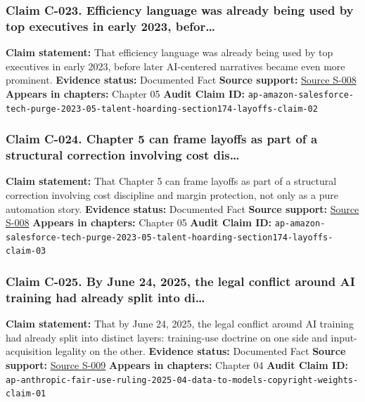 \documentclass[
  american,
  11pt,
  letterpaper,
]{article}
\begin{document}
\subsubsection{Claim C-023. Efficiency language was already being used
by top executives in early 2023,
befor\ldots{}}\label{claim-c-023-efficiency-language-was-already-being-used-by-top-executives-in-early-2023-befor}

\textbf{Claim statement:} That efficiency language was already being
used by top executives in early 2023, before later AI-centered
narratives became even more prominent. \textbf{Evidence status:}
Documented Fact \textbf{Source support:}
\hyperref[source-s-008-amazon-salesforce-jettison-jobs-in-latest-tech-worker-purge]{Source
S-008} \textbf{Appears in chapters:} Chapter 05 \textbf{Audit Claim ID:}
\texttt{ap-amazon-salesforce-tech-purge-2023-05-talent-hoarding-section174-layoffs-claim-02}

\subsubsection{Claim C-024. Chapter 5 can frame layoffs as part of a
structural correction involving cost
dis\ldots{}}\label{claim-c-024-chapter-5-can-frame-layoffs-as-part-of-a-structural-correction-involving-cost-dis}

\textbf{Claim statement:} That Chapter 5 can frame layoffs as part of a
structural correction involving cost discipline and margin protection,
not only as a pure automation story. \textbf{Evidence status:}
Documented Fact \textbf{Source support:}
\hyperref[source-s-008-amazon-salesforce-jettison-jobs-in-latest-tech-worker-purge]{Source
S-008} \textbf{Appears in chapters:} Chapter 05 \textbf{Audit Claim ID:}
\texttt{ap-amazon-salesforce-tech-purge-2023-05-talent-hoarding-section174-layoffs-claim-03}

\subsubsection{Claim C-025. By June 24, 2025, the legal conflict around
AI training had already split into
di\ldots{}}\label{claim-c-025-by-june-24-2025-the-legal-conflict-around-ai-training-had-already-split-into-di}

\textbf{Claim statement:} That by June 24, 2025, the legal conflict
around AI training had already split into distinct layers: training-use
doctrine on one side and input-acquisition legality on the other.
\textbf{Evidence status:} Documented Fact \textbf{Source support:}
\hyperref[source-s-009-anthropic-wins-ruling-on-ai-training-in-copyright-lawsuit-but-must-face-trial-on-pirated-books]{Source
S-009} \textbf{Appears in chapters:} Chapter 04 \textbf{Audit Claim ID:}
\texttt{ap-anthropic-fair-use-ruling-2025-04-data-to-models-copyright-weights-claim-01}
\end{document}
